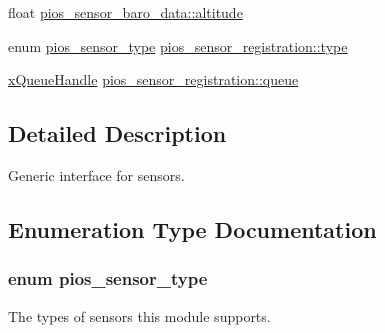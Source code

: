 \begin{DoxyCompactItemize}
float \hyperlink{group___p_i_o_s___s_e_n_s_o_r_s_ga36e1ee62fc132c0b2c992ef8efc5bb81}{pios\-\_\-sensor\-\_\-baro\-\_\-data\-::altitude}
\item 
enum \hyperlink{group___p_i_o_s___s_e_n_s_o_r_s_gadad1b67d985a6c9c150a70d23aac96a0}{pios\-\_\-sensor\-\_\-type} \hyperlink{group___p_i_o_s___s_e_n_s_o_r_s_gaf66f51be389998d910c8e9d3fc826a75}{pios\-\_\-sensor\-\_\-registration\-::type}
\item 
\hyperlink{_common_2_libraries_2_free_r_t_o_s_2_source_2include_2queue_8h_a229037f755b756156e34a440ce134b8b}{x\-Queue\-Handle} \hyperlink{group___p_i_o_s___s_e_n_s_o_r_s_gaeea1102e8510b8a5f3bb0cf298e7ebea}{pios\-\_\-sensor\-\_\-registration\-::queue}
\end{DoxyCompactItemize}


\subsection{Detailed Description}
Generic interface for sensors. 

\subsection{Enumeration Type Documentation}
\hypertarget{group___p_i_o_s___s_e_n_s_o_r_s_gadad1b67d985a6c9c150a70d23aac96a0}{
\subsubsection[{pios\-\_\-sensor\-\_\-type}]{\setlength{\rightskip}{0pt plus 5cm}enum {\bf pios\-\_\-sensor\-\_\-type}}}\label{group___p_i_o_s___s_e_n_s_o_r_s_gadad1b67d985a6c9c150a70d23aac96a0}


The types of sensors this module supports. 

